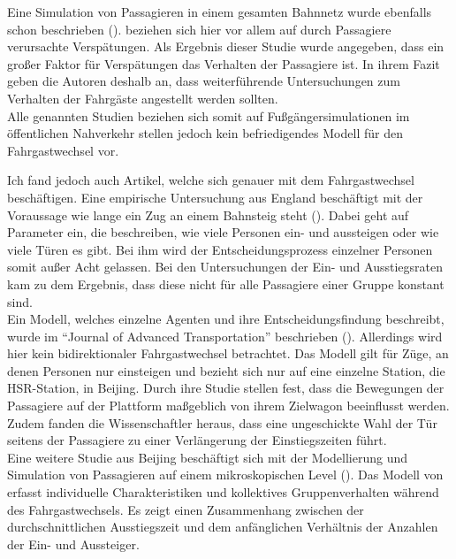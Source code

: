 Eine Simulation von Passagieren in einem gesamten Bahnnetz wurde ebenfalls schon beschrieben (\cite{Albert.2018}). \cite{Albert.2018} beziehen sich hier vor allem auf durch Passagiere verursachte Verspätungen. Als Ergebnis dieser Studie wurde angegeben, dass ein großer Faktor für Verspätungen das Verhalten der Passagiere ist. In ihrem Fazit geben die Autoren deshalb an, dass weiterführende Untersuchungen zum Verhalten der Fahrgäste angestellt werden sollten. \\
Alle genannten Studien beziehen sich somit auf Fußgängersimulationen im öffentlichen Nahverkehr stellen jedoch kein befriedigendes Modell für den Fahrgastwechsel vor.

Ich fand jedoch auch Artikel, welche sich genauer mit dem Fahrgastwechsel beschäftigen. Eine empirische Untersuchung aus England beschäftigt mit der Voraussage wie lange ein Zug an einem Bahnsteig steht (\cite{Harris.2006}). Dabei geht \cite{Harris.2006} auf Parameter ein, die \zB beschreiben, wie viele Personen ein- und aussteigen oder wie viele Türen es gibt. Bei ihm wird der Entscheidungsprozess einzelner Personen somit außer Acht gelassen. Bei den Untersuchungen der Ein- und Ausstiegsraten kam \cite{Harris.2006} zu dem Ergebnis, dass diese nicht für alle Passagiere einer Gruppe konstant sind. \\
Ein Modell, welches einzelne Agenten und ihre Entscheidungsfindung beschreibt, wurde im "`Journal of Advanced Transportation"' beschrieben (\cite{Tang.2017}). Allerdings wird hier kein bidirektionaler Fahrgastwechsel betrachtet. Das Modell gilt für Züge, an denen Personen nur einsteigen und bezieht sich nur auf eine einzelne Station, die HSR-Station, in Beijing. Durch ihre Studie stellen \cite{Tang.2017} fest, dass die Bewegungen der Passagiere auf der Plattform maßgeblich von ihrem Zielwagon beeinflusst werden. Zudem fanden die Wissenschaftler heraus, dass eine ungeschickte Wahl der Tür seitens der Passagiere zu einer Verlängerung der Einstiegszeiten führt.\\
Eine weitere Studie aus Beijing beschäftigt sich mit der Modellierung und Simulation von Passagieren auf einem mikroskopischen Level (\cite{Zhang.2008}). Das Modell von \cite{Zhang.2008} erfasst individuelle Charakteristiken und kollektives Gruppenverhalten während des Fahrgastwechsels. Es zeigt einen Zusammenhang zwischen der durchschnittlichen Ausstiegszeit und dem anfänglichen Verhältnis der Anzahlen der Ein- und Aussteiger.

